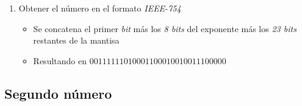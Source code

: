 \documentclass[12pt]{article}
\begin{document}
\begin{enumerate}
\begin{itemize}
            \setlength{\parskip}{-8pt}
            \item Teniendo en cuenta el número obtenido anteriormente, 
                $1.100011000100100111$, se consideran los números a partir de 
                la coma, ésto es $100011000100100111$
            \item Se completa con $0$'s hasta completar $23$ dígitos.
            \item La \textit{mantisa} es $10001100010010011100000$
        \end{itemize}
    \item Obtener el número en el formato \textit{IEEE-754} 
        \begin{itemize}
            \setlength{\parskip}{-8pt}
            \item Se concatena el primer \textit{bit} más los \textit{8 bits} 
                del exponente más los \textit{23 bits} restantes de la mantisa
            \item Resultando en $00111111010001100010010011100000$
        \end{itemize}
\end{enumerate}

\subsection{Segundo número}%
\label{sub:segundo}
\end{document}
